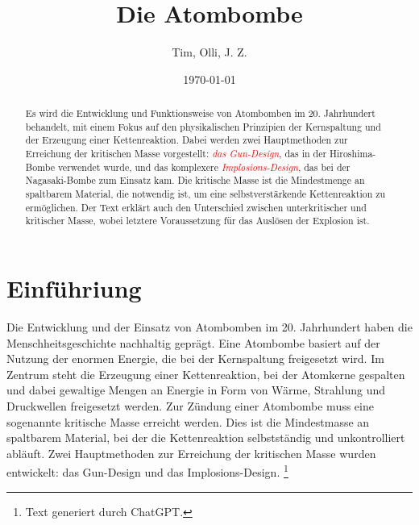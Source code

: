 \documentclass[a4paper,12pt]{article}
\title{Die Atombombe}
\author{Tim, Olli, J. Z.}
\date{\today}
\begin{document}
\pagestyle{fancy}

\fancyfoot[LE,RO]{\thepage}

\maketitle

\begin{abstract}
\noindent Es wird die Entwicklung und Funktionsweise von Atombomben im 20. Jahrhundert behandelt, mit einem Fokus auf den physikalischen Prinzipien der Kernspaltung und der Erzeugung einer Kettenreaktion. Dabei werden zwei Hauptmethoden zur Erreichung der kritischen Masse vorgestellt: \textcolor{red}{\textit{das Gun-Design}}, das in der Hiroshima-Bombe verwendet wurde, und das komplexere \textcolor{red}{\textit{Implosions-Design}}, das bei der Nagasaki-Bombe zum Einsatz kam. Die kritische Masse ist die Mindestmenge an spaltbarem Material, die notwendig ist, um eine selbstverstärkende Kettenreaktion zu ermöglichen. Der Text erklärt auch den Unterschied zwischen unterkritischer und kritischer Masse, wobei letztere Voraussetzung für das Auslösen der Explosion ist.
\end{abstract}

\tableofcontents
\listoffigures

\newpage

\section{Einführiung}
Die Entwicklung und der Einsatz von Atombomben im 20. Jahrhundert haben die Menschheitsgeschichte nachhaltig geprägt. Eine Atombombe basiert auf der Nutzung der enormen Energie, die bei der Kernspaltung freigesetzt wird. Im Zentrum steht die Erzeugung einer Kettenreaktion, bei der Atomkerne gespalten und dabei gewaltige Mengen an Energie in Form von Wärme, Strahlung und Druckwellen freigesetzt werden.
Zur Zündung einer Atombombe muss eine sogenannte kritische Masse erreicht werden. Dies ist die Mindestmasse an spaltbarem Material, bei der die Kettenreaktion selbstständig und unkontrolliert abläuft. Zwei Hauptmethoden zur Erreichung der kritischen Masse wurden entwickelt: das Gun-Design und das Implosions-Design.
\footnote{Text generiert durch ChatGPT.}
\end{document}
